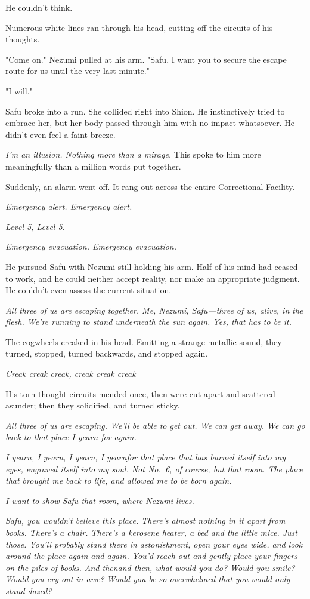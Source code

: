 He couldn't think.

Numerous white lines ran through his head, cutting off the circuits of
his thoughts.

"Come on." Nezumi pulled at his arm. "Safu, I want you to secure the
escape route for us until the very last minute."

"I will."

Safu broke into a run. She collided right into Shion. He instinctively
tried to embrace her, but her body passed through him with no impact
whatsoever. He didn't even feel a faint breeze.

\emph{I'm an illusion. Nothing more than a mirage.} This spoke to him more
meaningfully than a million words put together.

Suddenly, an alarm went off. It rang out across the entire Correctional
Facility.

\emph{Emergency alert. Emergency alert.}

\emph{Level 5, Level 5.}

\emph{Emergency evacuation. Emergency evacuation.}

He pursued Safu with Nezumi still holding his arm. Half of his mind had
ceased to work, and he could neither accept reality, nor make an
appropriate judgment. He couldn't even assess the current situation.

\emph{All three of us are escaping together. Me, Nezumi, Safu---three of us,
alive, in the flesh. We're running to stand underneath the sun again.
Yes, that has to be it.}

The cogwheels creaked in his head. Emitting a strange metallic sound,
they turned, stopped, turned backwards, and stopped again.

\emph{Creak creak creak, creak creak creak\el }

His torn thought circuits mended once, then were cut apart and scattered
asunder; then they solidified, and turned sticky.

\emph{All three of us are escaping. We'll be able to get out. We can get away.
We can go back to that place I yearn for again.}

\emph{I yearn, I yearn, I yearn, I yearn\el for that place that has burned
itself into my eyes, engraved itself into my soul. Not No.~6, of course,
but that room. The place that brought me back to life, and allowed me to
be born again.}

\emph{I want to show Safu that room, where Nezumi lives.}

\emph{Safu, you wouldn't believe this place. There's almost nothing in it
apart from books. There's a chair. There's a kerosene heater, a bed\el 
and the little mice. Just those. You'll probably stand there in
astonishment, open your eyes wide, and look around the place again and
again. You'd reach out and gently place your fingers on the piles of
books. And then\el and then, what would you do? Would you smile? Would
you cry out in awe? Would you be so overwhelmed that you would only
stand dazed?}

